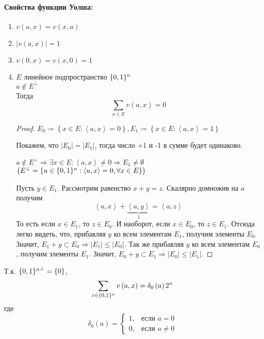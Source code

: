 \paragraph*{Свойства функции Уолша:}
\begin{enumerate}
\item $v\left(a,x\right)=v\left(x,a\right)$
\item $\left|v\left(a,x\right)\right|=1$
\item $v\left(0,x\right)=v\left(x,0\right)=1$
\item $E$ линейное подпространство $\{0,1\}^n$\\
$a\not\in E^{\perp}$\\
Тогда 
\[
\sum_{x\in E}v\left(a,x\right)=0
\]


\begin{proof}
$E_{0}\coloneqq\left\{ x\in E:\left\langle a,x\right\rangle =0\right\} ,E_{1}\coloneqq\left\{ x\in E:\left\langle a,x\right\rangle =1\right\} $

Покажем, что $\left|E_{0}\right|=\left|E_{1}\right|$, тогда число
+1 и -1 в сумме будет одинаково.

$a\not\in E^{\perp}\Rightarrow\exists x\in E:\left\langle a,x\right\rangle \not=0\Rightarrow E_{1}\not=\emptyset$
\textcolor{blue}{$\left(E^{\perp}=\left\{ u\in \{0,1\}^n:\left\langle u,x\right\rangle =0,\forall x\in E\right\} \right)$}

Пусть $y\in E_{1}$. Рассмотрим равенство $x+y=z$. Скалярно домножив
на $a$ получим
\[
\left\langle a,x\right\rangle +\underbrace{\left\langle a,y\right\rangle }_{1}=\left\langle a,z\right\rangle 
\]
То есть если $x\in E_{1}$, то $z\in E_{0}$. И наоборот, если $x\in E_{0}$,
то $z\in E_{1}.$ Отсюда легко видеть, что, прибавляя $y$ ко всем
элементам $E_{1}$, получим элементы $E_{0}$. Значит, $E_{1}+y\subset E_{0}\Rightarrow\left|E_{1}\right|\leq\left|E_{0}\right|$.
Так же прибавляя $y$ ко всем элементам $E_{0}$, получим элементы
$E_{1}$. Значит, $E_{0}+y\subset E_{1}\Rightarrow\left|E_{0}\right|\leq\left|E_{1}\right|$.
\end{proof}
\end{enumerate}
\begin{corollary}
Т.к. ${\{0,1\}^n}^{\perp}=\left\{ 0\right\} $, 
\[
\sum_{x\in \{0,1\}^n}v\left(a,x\right)=\delta_{0}\left(a\right)2^{n}
\]
где 
\[
\delta_{0}\left(a\right)=\begin{cases}
1, & \text{если }a=0\\
0, & \text{если }a\not=0
\end{cases}
\]
\end{corollary}

